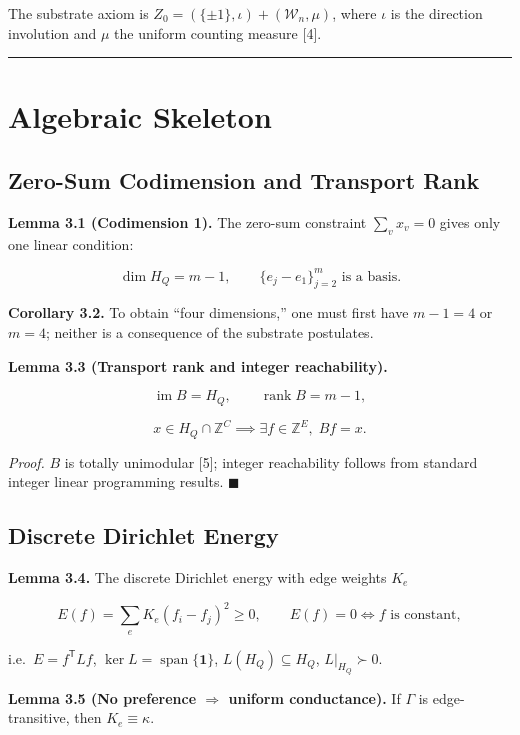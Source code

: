 \documentclass[
  11pt,
]{article}
\begin{document}
The substrate axiom is \(Z_0=(\{\pm1\},\iota)+(\mathcal W_n,\mu)\),
where \(\iota\) is the direction involution and \(\mu\) the uniform
counting measure {[}4{]}.

\begin{center}\rule{0.5\linewidth}{0.5pt}\end{center}

\section{Algebraic Skeleton}\label{algebraic-skeleton}

\subsection{Zero-Sum Codimension and Transport
Rank}\label{zero-sum-codimension-and-transport-rank}

\textbf{Lemma 3.1 (Codimension 1).} The zero-sum constraint
\(\sum_v x_v=0\) gives only one linear condition:

\[
\dim H_Q=m-1, \qquad \{e_j-e_1\}_{j=2}^m \text{ is a basis}.
\]

\textbf{Corollary 3.2.} To obtain ``four dimensions,'' one must first
have \(m-1=4\) or \(m=4\); neither is a consequence of the substrate
postulates.

\textbf{Lemma 3.3 (Transport rank and integer reachability).}

\[
\operatorname{im}B=H_Q, \qquad \operatorname{rank}B=m-1,
\]

\[
x\in H_Q\cap\mathbb Z^C \implies \exists f\in\mathbb Z^E,\; Bf=x.
\]

\emph{Proof.} \(B\) is totally unimodular {[}5{]}; integer reachability
follows from standard integer linear programming results.
\(\blacksquare\)

\subsection{Discrete Dirichlet
Energy}\label{discrete-dirichlet-energy}

\textbf{Lemma 3.4.} The discrete Dirichlet energy with edge weights
\(K_e\)

\[
E(f)=\sum_e K_e(f_i-f_j)^2 \ge 0, \qquad E(f)=0 \iff f \text{ is constant},
\]

i.e.~\(E=f^{\mathsf T}Lf\), \(\ker L=\operatorname{span}\{\mathbf 1\}\),
\(L(H_Q)\subseteq H_Q\), \(L|_{H_Q}\succ0\).

\textbf{Lemma 3.5 (No preference \(\Rightarrow\) uniform conductance).}
If \(\Gamma\) is edge-transitive, then \(K_e\equiv\kappa\).
\end{document}
